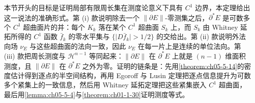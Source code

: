\documentclass[../../main.tex]{subfiles}%
\begin{document}
\begin{remark}\label{remark:ch05-thm-5-15-动机}
本节开头的目标是证明局部有限周长集在测度论意义下具有 $C^1$ 边界，本定理给出这一说法的准确形式。第 (i) 款说明除去一个 $\lVert\partial E\rVert$-零测集之后，$\partial^*E$ 是可数多个 $C^1$ 超曲面片的并：每个 $K_k$ 落在某个 $C^1$ 超曲面 $S_k$ 上，而 $S_k$ 由 Whitney 延拓所得的 $C^1$ 函数 $\bar f_k$ 的零水平集与 $\{\lvert D\bar f_k\rvert>1/2\}$ 的交给出。第 (ii) 款说明外法向场 $\nu_E$ 与这些超曲面的法向一致，因此 $\nu_E$ 在每一片上是连续的单位法向。第 (iii) 款把周长测度与 $\mathcal{H}^{n-1}$ 等同起来：$\lVert\partial E\rVert$ 在 $\partial^*E$ 上就是 $(n-1)$ 维面积测度，且 $\lVert\partial E\rVert$ 在 $\partial^*E$ 之外为零。证明的链条是：先用\cref{theorem:ch05-5-14}的密度估计得到逐点的半空间结构，再用 Egoroff 与 Lusin 定理把逐点信息提升为可数多个紧集上的一致信息，然后用 Whitney 延拓定理把这些紧集嵌入 $C^1$ 超曲面，最后用\cref{lemma:ch05-5-4}与\cref{theorem:ch01-1-30}证明测度等式。%
\end{remark}
\end{document}
